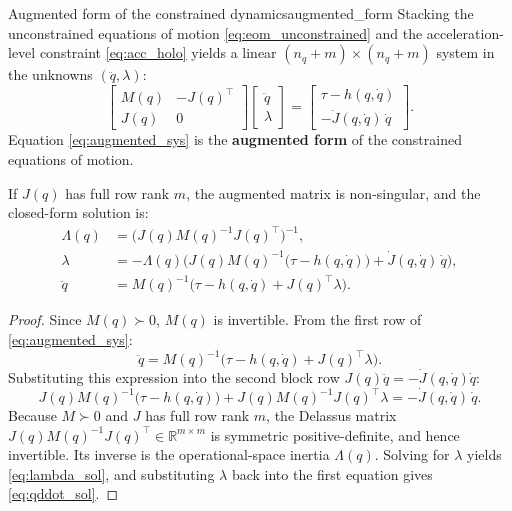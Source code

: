\documentclass[11pt,a4paper]{article}
\newcommand{\R}{\mathbb{R}}
\begin{document}
\begin{theorem}{Augmented form of the constrained dynamics}{augmented_form}
Stacking the unconstrained equations of motion \eqref{eq:eom_unconstrained} and the acceleration-level constraint \eqref{eq:acc_holo} yields a linear $(n_q + m) \times (n_q + m)$ system in the unknowns $(\ddot q, \lambda)$:
\begin{equation}\label{eq:augmented_sys}
\begin{bmatrix}
  M(q) & -J(q)^\top \\
  J(q) & 0
\end{bmatrix}
\begin{bmatrix}
  \ddot q \\
  \lambda
\end{bmatrix}
=
\begin{bmatrix}
  \tau - h(q,\dot q) \\
  -\dot J(q,\dot q)\,\dot q
\end{bmatrix}.
\end{equation}
Equation \eqref{eq:augmented_sys} is the \textbf{augmented form} of the constrained equations of motion.

If $J(q)$ has full row rank $m$, the augmented matrix is non-singular, and the closed-form solution is:
\begin{align}
  \Lambda(q) &= \big(J(q) M(q)^{-1} J(q)^\top\big)^{-1}, \label{eq:lambda_gen}\\
  \lambda &= -\Lambda(q)\Big(J(q) M(q)^{-1}\big(\tau - h(q,\dot q)\big) + \dot J(q,\dot q)\,\dot q\Big), \label{eq:lambda_sol}\\
  \ddot q &= M(q)^{-1}\big(\tau - h(q,\dot q) + J(q)^\top \lambda\big). \label{eq:qddot_sol}
\end{align}
\end{theorem}
\begin{proof}
Since $M(q) \succ 0$, $M(q)$ is invertible. From the first row of \eqref{eq:augmented_sys}:
\[
  \ddot q = M(q)^{-1}\big(\tau - h(q,\dot q) + J(q)^\top \lambda\big).
\]
Substituting this expression into the second block row $J(q)\ddot q = -\dot J(q,\dot q)\dot q$:
\[
  J(q) M(q)^{-1}\big(\tau - h(q,\dot q)\big) + J(q) M(q)^{-1} J(q)^\top \lambda = -\dot J(q,\dot q)\,\dot q.
\]
Because $M \succ 0$ and $J$ has full row rank $m$, the Delassus matrix $J(q) M(q)^{-1} J(q)^\top \in \R^{m \times m}$ is symmetric positive-definite, and hence invertible. Its inverse is the operational-space inertia $\Lambda(q)$. Solving for $\lambda$ yields \eqref{eq:lambda_sol}, and substituting $\lambda$ back into the first equation gives \eqref{eq:qddot_sol}.
\end{proof}
\end{document}
